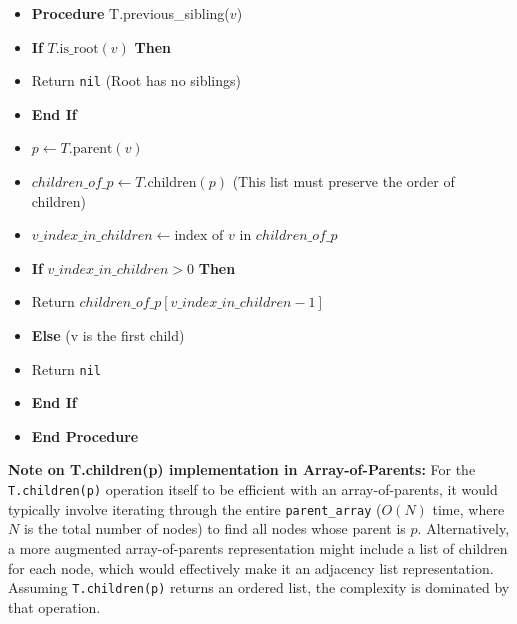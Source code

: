 \documentclass{article}
\begin{document}
\begin{itemize}
    \item \textbf{Procedure} T.previous\_sibling($v$)
    \item \hspace{0.5cm} \textbf{If} $T.\text{is\_root}(v)$ \textbf{Then}
    \item \hspace{1cm} Return \texttt{nil} (Root has no siblings)
    \item \hspace{0.5cm} \textbf{End If}
    
    \item \hspace{0.5cm} $p \gets T.\text{parent}(v)$
    \item \hspace{0.5cm} $children\_of\_p \gets T.\text{children}(p)$ (This list must preserve the order of children)
    
    \item \hspace{0.5cm} $v\_index\_in\_children \gets \text{index of } v \text{ in } children\_of\_p$
    
    \item \hspace{0.5cm} \textbf{If} $v\_index\_in\_children > 0$ \textbf{Then}
    \item \hspace{1cm} Return $children\_of\_p[v\_index\_in\_children - 1]$
    \item \hspace{0.5cm} \textbf{Else} (v is the first child)
    \item \hspace{1cm} Return \texttt{nil}
    \item \hspace{0.5cm} \textbf{End If}
    \item \textbf{End Procedure}
\end{itemize}
\textbf{Note on T.children(p) implementation in Array-of-Parents:}
For the \texttt{T.children(p)} operation itself to be efficient with an array-of-parents, it would typically involve iterating through the entire \texttt{parent\_array} ($O(N)$ time, where $N$ is the total number of nodes) to find all nodes whose parent is $p$. Alternatively, a more augmented array-of-parents representation might include a list of children for each node, which would effectively make it an adjacency list representation. Assuming \texttt{T.children(p)} returns an ordered list, the complexity is dominated by that operation.
\end{document}
